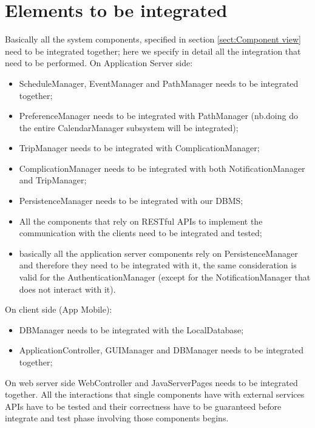 \section{Elements to be integrated}
Basically all the system components, specified in section \ref{sect:Component view} need to be integrated together; here we specify in detail all the integration that need to be performed.
On Application Server side:
\begin{itemize}
	\item ScheduleManager, EventManager and PathManager needs to be integrated together;
	\item PreferenceManager needs to be integrated with PathManager (nb.doing do the entire CalendarManager subsystem will be integrated);
	\item TripManager needs to be integrated with ComplicationManager;
	\item ComplicationManager needs to be integrated with both NotificationManager and TripManager;
	\item PersistenceManager needs to be integrated with our DBMS;
	\item All the components that rely on RESTful APIs to implement the communication with the clients need to be integrated and tested;
	\item basically all the application server components rely on PersistenceManager and therefore they need to be integrated with it, the same consideration is valid for the AuthenticationManager (except for the NotificationManager that does not interact with it).
\end{itemize}
On client side (App Mobile):
\begin{itemize}
	\item DBManager needs to be integrated with the LocalDatabase;
	\item ApplicationController, GUIManager and DBManager needs to be integrated together;
\end{itemize}
On web server side WebController and JavaServerPages needs to be integrated together.
All the interactions that single components have with external services APIs have to be tested and their correctness have to be guaranteed before integrate and test phase involving those components begins.


